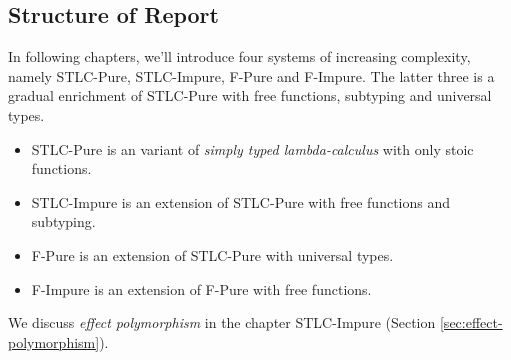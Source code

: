 \subsection{Structure of Report}

In following chapters, we'll introduce four systems of increasing
complexity, namely STLC-Pure, STLC-Impure, F-Pure and F-Impure. The
latter three is a gradual enrichment of STLC-Pure with free functions,
subtyping and universal types.

\begin{itemize}
\item STLC-Pure is an variant of \emph{simply typed lambda-calculus}
  with only stoic functions.
\item STLC-Impure is an extension of STLC-Pure with free functions and subtyping.
\item F-Pure is an extension of STLC-Pure with universal types.
\item F-Impure is an extension of F-Pure with free functions.
\end{itemize}

We discuss \emph{effect polymorphism} in the chapter STLC-Impure
(Section \ref{sec:effect-polymorphism}).
